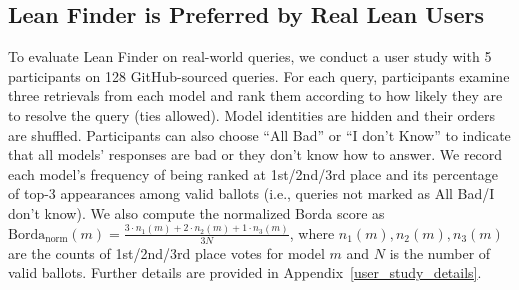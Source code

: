 \documentclass{article} %
\begin{document}
\begin{table}[h!]
\centering
\small
\setlength{\tabcolsep}{2.5pt}
\captionsetup{font=small}
\caption{Comparison of Lean Finder with Lean State Search, Real Prover Search, and GPT-4o  on retrieval performance across two input modalities: augmented proof state and raw proof state. 
``Augmented proof state'': proof state augmented with natural language description of proofs (Section~\ref{sec:other_input_modalities}). ``Raw proof state'': proof state without the augmentation. MRR is omitted for GPT-4o because it often
generates fewer than 10 candidates. The best results are presented in \textbf{bold}.
}
\vspace{-1em}
\vspace{-2em}
\end{table}




\subsection{Lean Finder is Preferred by Real Lean Users}
\label{sec:user_study}
To evaluate Lean Finder on real-world queries, we conduct a user study with 5 participants on 128 GitHub-sourced queries.
For each query, participants examine three retrievals from each model and rank them according to how likely they are to resolve the query (ties allowed).
Model identities are hidden and their orders are shuffled.
Participants can also choose ``All Bad'' or ``I don’t Know'' to indicate that all models' responses are bad or they don’t know how to answer.
We record each model’s frequency of being ranked at 1st/2nd/3rd place and its percentage of top-3 appearances among valid ballots (i.e., queries not marked as All Bad/I don’t know).
We also compute the normalized Borda score as 
\(\mathrm{Borda}_{\text{norm}}(m)=\tfrac{3\cdot n_1(m)+2\cdot n_2(m)+1\cdot n_3(m)}{3N}\),
where \(n_1(m),n_2(m),n_3(m)\) are the counts of 1st/2nd/3rd place votes for model \(m\) and \(N\) is the number of valid ballots.
Further details are provided in Appendix~\ref{user_study_details}.
\end{document}
